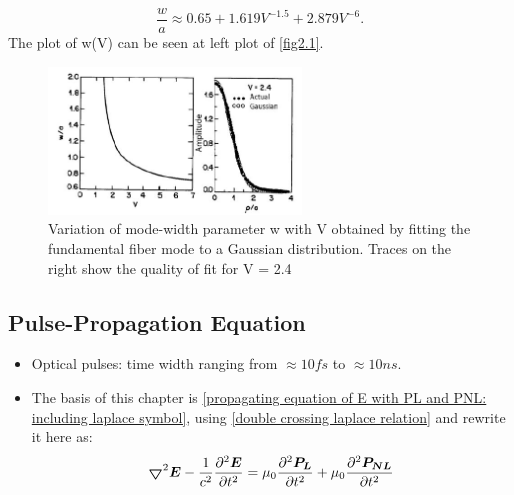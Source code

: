 \documentclass[12pt]{extarticle}
\numberwithin{equation}{section}
\numberwithin{figure}{section}
\numberwithin{table}{section}
\newcommand{\<}{\langle}
\renewcommand{\>}{\rangle}
\theoremstyle{definition}
\newcommand{\Lap}{\boldsymbol{\bigtriangledown}}
\begin{document}
\begin{itemize}
\begin{equation}
                        \frac{w}{a} \approx 0.65+1.619V^{-1.5}+2.879V^{-6}.
                    \end{equation}
                    The plot of w(V) can be seen at left plot of \autoref{fig2.1}.
                    \begin{figure}[htbp]
                        \centering
                        \includegraphics[width=0.6\textwidth]{images/fig2.1.PNG}
                        \caption{Variation of mode-width parameter w with V obtained by fitting the fundamental
                        fiber mode to a Gaussian distribution. Traces on the right show the quality of fit for V = 2.4}
                        \label{fig2.1}
                    \end{figure}
            \end{itemize}
    \subsection{Pulse-Propagation Equation}
        \begin{itemize}
            \item Optical pulses: time width ranging from $\approx10 fs$ to $\approx10 ns$.
            \item The basis of this chapter is \autoref{propagating equation of E with PL and PNL: including laplace symbol}, using \autoref{double crossing laplace relation} and rewrite it here as:
                \begin{equation}
                    \Lap^2\boldsymbol{E} -\frac{1}{c^2}\pdv[2]{\boldsymbol{E}}{t}=\mu_0\pdv[2]{\boldsymbol{P_L}}{t}+\mu_0\pdv[2]{\boldsymbol{P_{NL}}}{t}
                    \label{basis of pulse propagation function: maxwell equation}
                \end{equation}
        \end{itemize}
        
\end{document}
